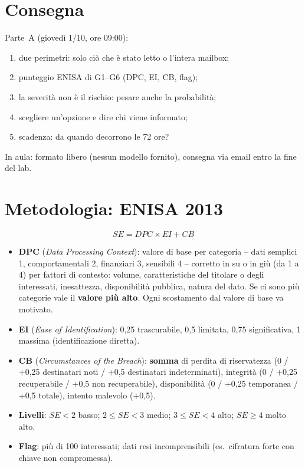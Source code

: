 \section{Consegna}
Parte~A (giovedì 1/10, ore 09:00):
\begin{enumerate}
  \item due perimetri: solo ciò che è stato letto o l'intera mailbox;
  \item punteggio ENISA di G1--G6 (DPC, EI, CB, flag);
  \item la severità non è il rischio: pesare anche la probabilità;
  \item scegliere un'opzione e dire chi viene informato;
  \item scadenza: da quando decorrono le 72 ore?
\end{enumerate}
In aula: formato libero (nessun modello fornito), consegna via email entro la fine del lab.

\section{Metodologia: ENISA 2013}
\[
SE = DPC \times EI + CB
\]
\begin{itemize}
  \item \textbf{DPC} (\emph{Data Processing Context}): valore di base per categoria -- dati semplici
    1, comportamentali 2, finanziari 3, sensibili 4 -- corretto in su o in giù (da 1 a 4) per fattori
    di contesto: volume, caratteristiche del titolare o degli interessati, inesattezza, disponibilità
    pubblica, natura del dato. Se ci sono più categorie vale il \textbf{valore più alto}. Ogni
    scostamento dal valore di base va motivato.
  \item \textbf{EI} (\emph{Ease of Identification}): 0,25 trascurabile, 0,5 limitata, 0,75
    significativa, 1 massima (identificazione diretta).
  \item \textbf{CB} (\emph{Circumstances of the Breach}): \textbf{somma} di perdita di riservatezza
    (0 / +0,25 destinatari noti / +0,5 destinatari indeterminati), integrità (0 / +0,25 recuperabile /
    +0,5 non recuperabile), disponibilità (0 / +0,25 temporanea / +0,5 totale), intento malevolo
    (+0,5).
  \item \textbf{Livelli}: $SE<2$ basso; $2 \le SE < 3$ medio; $3 \le SE < 4$ alto; $SE \ge 4$ molto
    alto.
  \item \textbf{Flag}: più di 100 interessati; dati resi incomprensibili (es.\ cifratura forte con
    chiave non compromessa).
\end{itemize}

